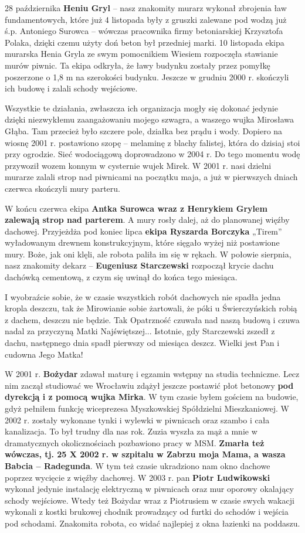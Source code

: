 28 października \textbf{Heniu Gryl} – nasz znakomity murarz wykonał zbrojenia ław fundamentowych, które już 4 listopada były z gruszki zalewane pod wodzą już ś.p. Antoniego Surowca – wówczas pracownika firmy betoniarskiej Krzysztofa Polaka, dzięki czemu użyty doń beton był przedniej marki. 10 listopada ekipa murarska Henia Gryla ze swym pomocnikiem Wiesiem rozpoczęła stawianie murów piwnic. Ta ekipa odkryła, że ławy budynku zostały przez pomyłkę poszerzone o 1,8 m na szerokości budynku. Jeszcze w grudniu 2000 r. skończyli ich budowę i zalali schody wejściowe.

Wszystkie te działania, zwłaszcza ich organizacja mogły się dokonać jedynie dzięki niezwykłemu zaangażowaniu mojego szwagra, a waszego wujka Mirosława Głąba. Tam przecież było szczere pole, działka bez prądu i wody. Dopiero na wiosnę 2001 r. postawiono szopę – melaminę z blachy falistej, która do dzisiaj stoi przy ogrodzie. Sieć wodociągową doprowadzono w 2004 r. Do tego momentu wodę przywoził wozem konnym w cysternie wujek Mirek. W 2001 r. nasi dzielni murarze zalali strop nad piwnicami na początku maja, a już w pierwszych dniach czerwca skończyli mury parteru.

W końcu czerwca ekipa \textbf{Antka Surowca wraz z Henrykiem Grylem zalewają strop nad parterem}. A mury rosły dalej, aż do planowanej więźby dachowej. Przyjeżdża pod koniec lipca \textbf{ekipa Ryszarda Borczyka} „Tirem” wyładowanym drewnem konstrukcyjnym, które sięgało wyżej niż postawione mury. Boże, jak oni klęli, ale robota paliła im się w rękach. W połowie sierpnia, nasz znakomity dekarz – \textbf{Eugeniusz Starczewski} rozpoczął krycie dachu dachówką cementową, z czym się uwinął do końca tego miesiąca.

I wyobraźcie sobie, że w czasie wszystkich robót dachowych nie spadła jedna kropla deszczu, tak że Mirowianie sobie żartowali, że póki u Świerczyńskich robią z dachem, deszczu nie będzie. Tak Opatrzność czuwała nad naszą budową i czuwa nadal za przyczyną Matki Najświętszej... Istotnie, gdy Starczewski zszedł z dachu, następnego dnia spadł pierwszy od miesiąca deszcz. Wielki jest Pan i cudowna Jego Matka!

W 2001 r. \textbf{Bożydar} zdawał maturę i egzamin wstępny na studia techniczne. Lecz nim zaczął studiować we Wrocławiu zdążył jeszcze postawić płot betonowy \textbf{pod dyrekcją i z pomocą wujka Mirka}. W tym czasie byłem gościem na budowie, gdyż pełniłem funkcję wiceprezesa Myszkowskiej Spółdzielni Mieszkaniowej. W 2002 r. zostały wykonane tynki i wylewki w piwnicach oraz szambo i cała kanalizacja. To był trudny dla nas rok. Zuzia wyszła za mąż a mnie w dramatycznych okolicznościach pozbawiono pracy w MSM. \textbf{Zmarła też wówczas, tj. 25 X 2002 r. w szpitalu w Zabrzu moja Mama, a wasza Babcia – Radegunda}. W tym też czasie ukradziono nam okno dachowe poprzez wycięcie z więźby dachowej. W 2003 r. pan \textbf{Piotr Ludwikowski} wykonał jedynie instalację elektryczną w piwnicach oraz mur oporowy okalający schody wejściowe. Wtedy też Bożydar wraz z Piotrusiem w czasie swych wakacji wykonali z kostki brukowej chodnik prowadzący od furtki do schodów i wejścia pod schodami. Znakomita robota, co widać najlepiej z okna łazienki na poddaszu.

